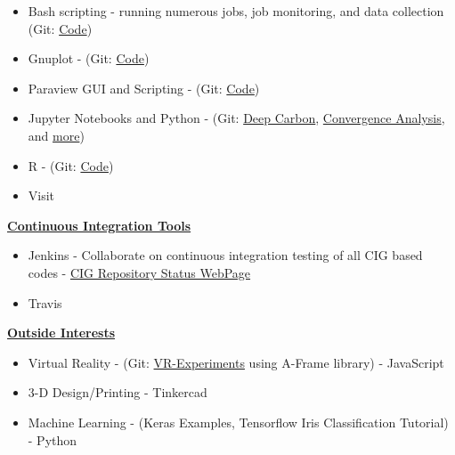 \documentclass[11pt]{ltxdoc}
\begin{document}
\begin{description}
\begin{itemize}
        \item Bash scripting - running numerous jobs, job monitoring, and data collection (Git: \href{https://github.com/hlokavarapu/computational_tools/tree/master/slurm_scripts}{Code})
      	    	
      	\item Gnuplot - (Git: \href{https://github.com/hlokavarapu/computational_tools/tree/master/Gnuplot_scripts}{Code})
      	
        \item Paraview GUI and Scripting - (Git: \href{https://github.com/hlokavarapu/computational_tools/blob/master/Paraview_scripts/Find_timestep_given_nondim_time_2_comp.py}{Code})
        
        \item Jupyter Notebooks and Python - (Git: \href{https://github.com/hlokavarapu/Prospectus/blob/master/SlideDeck/MeetingPresentation.ipynb}{Deep Carbon}, \href{https://github.com/EGP-CIG-REU/SECOND_PARTICLE_PAPER/blob/master/00JUPYTER_NOTEBOOKS/egp_time_dependent_annulus_v-02/egp_time_dependent_annulus_v-02-Exact.ipynb}{Convergence Analysis}, and \href{https://github.com/hlokavarapu/Geology_Journal/tree/master/00JUPYTER}{more})
       
        \item R - (Git: \href{https://github.com/hlokavarapu/computational_tools/tree/master/R_scripts}{Code})
        
        \item Visit
                
      \end{itemize}
      
    \item[] \textbf{\underline{Continuous Integration Tools}}
  
    \begin{itemize}
      \item Jenkins - Collaborate on continuous integration testing of all CIG based codes - \href{https://blofeld.geodynamics.org/}{CIG Repository Status WebPage}
      \item Travis
    \end{itemize}
    
    \item[] \textbf{\underline{Outside Interests}}
    
      \begin{itemize}
        \item Virtual Reality - (Git: \href{https://github.com/hlokavarapu/VR-Experiments}{VR-Experiments} using A-Frame library) - JavaScript
        \item  3-D Design/Printing - Tinkercad
      
        \item  Machine Learning - (Keras Examples, Tensorflow Iris Classification Tutorial) - Python
      
      \end{itemize}

  \end{description}
\end{document}
